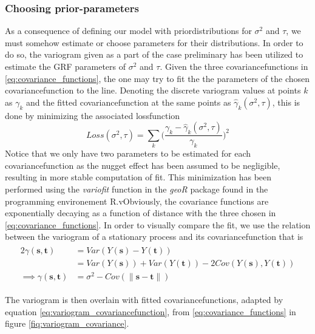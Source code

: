 \documentclass{article}
\begin{document}
\subsubsection{Choosing prior-parameters}
As a consequence of defining our model with priordistributions for $\sigma^2$ and $\tau$, we must somehow estimate or choose parameters for their distributions. In order to do so, the variogram given as a part of the case preliminary has been utilized to estimate the GRF parameters of $\sigma^2$ and $\tau$. Given the three covariancefunctions in \ref{eq:covariance_functions}, the one may try to fit the the parameters of the chosen covariancefunction to the line. Denoting the discrete variogram values at points $k$ as $\gamma_k$ and the fitted covariancefunction at the same points as $\hat{\gamma}_k(\sigma^2, \tau)$, this is done by minimizing the associated lossfunction
\begin{equation}
Loss(\sigma^2, \tau) = \sum_k \bigg( \frac{\gamma_k - \hat{\gamma}_k(\sigma^2, \tau)}{\gamma_k} \bigg)^2
\end{equation}
Notice that we only have two parameters to be estimated for each covariancefunction as the nugget effect has been assumed to be negligible, resulting in more stable computation of fit. This minimization has been performed using the \textit{variofit} function in the \textit{geoR} package found in the programming environement R.vObviously, the covariance functions are exponentially decaying as a function of distance with the three chosen in \ref{eq:covariance_functions}. In order to visually compare the fit, we use the relation between the variogram of a stationary process and its covariancefunction that is
\begin{align} \label{eq:variogram_covariancefunction}
\begin{split}
    2\gamma(\textbf{s},\textbf{t}) &= Var(Y(\textbf{s}) - Y(\textbf{t})) \\
    &= Var(Y(\textbf{s})) + Var(Y(\textbf{t})) - 2Cov(Y(\textbf{s}),Y(\textbf{t})) \\
    \implies \gamma(\textbf{s},\textbf{t}) &= \sigma^2 - Cov(\|\textbf{s}-\textbf{t}\|) 
\end{split}
\end{align}

The variogram is then overlain with fitted covariancefunctions, adapted by equation \ref{eq:variogram_covariancefunction}, from \ref{eq:covariance_functions} in figure \ref{fiq:variogram_covariance}.  \\
\end{document}
